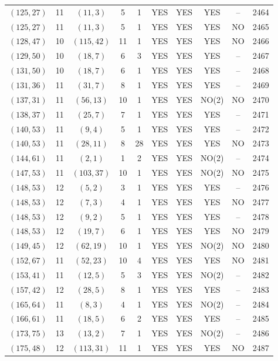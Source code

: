 \begin{longtable}{|c|c|c|c|c|c|c|c|c|c|}
$(125, 27)$ & 11 & $(11, 3)$ & 5 & 1 & YES & YES & YES & -- & 2464\\
$(125, 27)$ & 11 & $(11, 3)$ & 5 & 1 & YES & YES & YES & NO & 2465\\
$(128, 47)$ & 10 & $(115, 42)$ & 11 & 1 & YES & YES & YES & NO & 2466\\
$(129, 50)$ & 10 & $(18, 7)$ & 6 & 3 & YES & YES & YES & -- & 2467\\
$(131, 50)$ & 10 & $(18, 7)$ & 6 & 1 & YES & YES & YES & -- & 2468\\
$(131, 36)$ & 11 & $(31, 7)$ & 8 & 1 & YES & YES & YES & -- & 2469\\
$(137, 31)$ & 11 & $(56, 13)$ & 10 & 1 & YES & YES & NO(2) & NO & 2470\\
$(138, 37)$ & 11 & $(25, 7)$ & 7 & 1 & YES & YES & YES & -- & 2471\\
$(140, 53)$ & 11 & $(9, 4)$ & 5 & 1 & YES & YES & YES & -- & 2472\\
$(140, 53)$ & 11 & $(28, 11)$ & 8 & 28 & YES & YES & YES & NO & 2473\\
$(144, 61)$ & 11 & $(2, 1)$ & 1 & 2 & YES & YES & NO(2) & -- & 2474\\
$(147, 53)$ & 11 & $(103, 37)$ & 10 & 1 & YES & YES & NO(2) & NO & 2475\\
$(148, 53)$ & 12 & $(5, 2)$ & 3 & 1 & YES & YES & YES & -- & 2476\\
$(148, 53)$ & 12 & $(7, 3)$ & 4 & 1 & YES & YES & YES & NO & 2477\\
$(148, 53)$ & 12 & $(9, 2)$ & 5 & 1 & YES & YES & YES & -- & 2478\\
$(148, 53)$ & 12 & $(19, 7)$ & 6 & 1 & YES & YES & YES & NO & 2479\\
$(149, 45)$ & 12 & $(62, 19)$ & 10 & 1 & YES & YES & NO(2) & NO & 2480\\
$(152, 67)$ & 11 & $(52, 23)$ & 10 & 4 & YES & YES & YES & NO & 2481\\
$(153, 41)$ & 11 & $(12, 5)$ & 5 & 3 & YES & YES & NO(2) & -- & 2482\\
$(157, 42)$ & 12 & $(28, 5)$ & 8 & 1 & YES & YES & YES & -- & 2483\\
$(165, 64)$ & 11 & $(8, 3)$ & 4 & 1 & YES & YES & NO(2) & -- & 2484\\
$(166, 61)$ & 11 & $(18, 5)$ & 6 & 2 & YES & YES & YES & -- & 2485\\
$(173, 75)$ & 13 & $(13, 2)$ & 7 & 1 & YES & YES & NO(2) & -- & 2486\\
$(175, 48)$ & 12 & $(113, 31)$ & 11 & 1 & YES & YES & YES & NO & 2487\\

\end{longtable}
